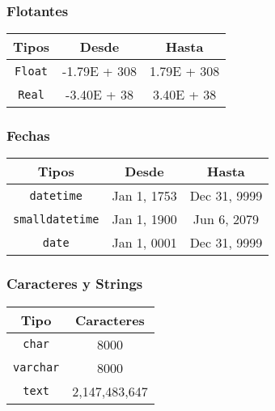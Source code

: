 \begin{enumerate}
\subsubsection*{Flotantes}
\begin{center}
\begin{tabular}{|c|c|c|}
\hline
\textbf{Tipos} & \textbf{Desde} & \textbf{Hasta} \\ \hline
\texttt{Float}     & -1.79E + 308 & 1.79E + 308 \\ \hline
\texttt{Real}        & -3.40E + 38            & 3.40E + 38            \\ \hline
\end{tabular}
\end{center}
\vspace{-0.5cm}
\subsubsection*{Fechas}

\begin{center}
\begin{tabular}{|c|c|c|}
\hline
\textbf{Tipos} & \textbf{Desde} & \textbf{Hasta} \\ \hline
\texttt{datetime}     & Jan 1, 1753& Dec 31, 9999 \\ \hline
\texttt{smalldatetime}        & Jan 1, 1900            & Jun 6, 2079           \\ \hline
\texttt{date}        & Jan 1, 0001           & Dec 31, 9999           \\ \hline
\end{tabular}
\end{center}
\vspace{-0.5cm}
\subsubsection*{Caracteres y Strings}

\begin{center}
\begin{tabular}{|c|c|}
\hline
\textbf{Tipo}     & \textbf{Caracteres}  \\ \hline
\texttt{char}     & 8000  \\ \hline
\texttt{varchar}  & 8000  \\ \hline
\texttt{text}     & 2,147,483,647  \\ \hline
\end{tabular}
\end{center}
\vspace{-0.5cm}


\end{enumerate}
